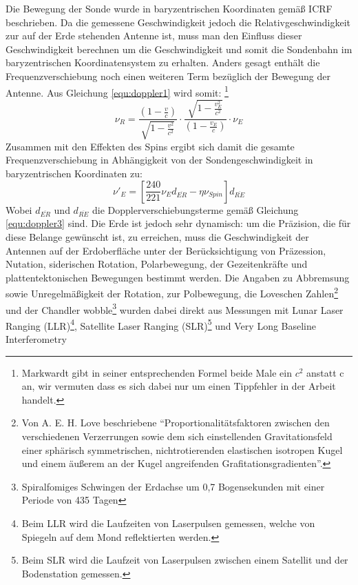 Die Bewegung der Sonde wurde in baryzentrischen Koordinaten gemäß ICRF beschrieben. %
Da die gemessene Geschwindigkeit jedoch die Relativgeschwindigkeit zur auf der Erde stehenden Antenne ist,
muss man den Einfluss dieser Geschwindigkeit berechnen um die Geschwindigkeit und somit die Sondenbahn im baryzentrischen Koordinatensystem zu erhalten.
Anders gesagt enthält die Frequenzverschiebung noch einen weiteren Term bezüglich der Bewegung der Antenne. Aus Gleichung \ref{equ:doppler1} wird somit:
\footnote{Markwardt gibt in seiner entsprechenden Formel beide Male ein $c^2$ anstatt c an, wir vermuten dass es sich dabei nur um einen Tippfehler in der Arbeit handelt.}
\begin{equation}
\label{equ:doppler3}
 \nu_R = \frac{(1-\frac{v}{c})}{\sqrt{1-\frac{v^2}{c^2}}} \cdot \frac{\sqrt{1-\frac{v_E^2}{c^2}}}{(1-\frac{v_E}{c})} \cdot \nu_E 
\end{equation}
Zusammen mit den Effekten des Spins ergibt sich damit die gesamte Frequenzverschiebung in Abhängigkeit von der Sondengeschwindigkeit in baryzentrischen Koordinaten zu:
\begin{equation}
 \nu'_E = \left[ \frac{240}{221} \nu_E d_{\overline{ER}} - \eta \nu_{Spin} \right]  d_{\overline{RE}}
\end{equation}
Wobei $d_{\overline{ER}}$ und $d_{\overline{RE}}$ die Dopplerverschiebungsterme gemäß Gleichung \ref{equ:doppler3} sind.
Die Erde ist jedoch sehr dynamisch: um die Präzision, die für diese Belange gewünscht ist, zu erreichen, muss die Geschwindigkeit der Antennen auf der Erdoberfläche unter der Berücksichtigung von Präzession, Nutation,
siderischen Rotation, Polarbewegung, der Gezeitenkräfte und plattentektonischen Bewegungen bestimmt werden.
Die Angaben zu Abbremsung sowie Unregelmäßigkeit der Rotation, zur Polbewegung, die Loveschen Zahlen\footnote{Von A. E. H. Love beschriebene ``Proportionalitätsfaktoren zwischen den verschiedenen Verzerrungen sowie dem sich einstellenden Gravitationsfeld einer sphärisch symmetrischen, nichtrotierenden elastischen isotropen Kugel und einem äußerem an der Kugel angreifenden Grafitationsgradienten''\cite{Dittus2006}.} und der Chandler wobble\footnote{Spiralfomiges Schwingen
der Erdachse um 0,7 Bogensekunden mit einer Periode von 435 Tagen} %
wurden dabei direkt aus Messungen mit Lunar Laser Ranging (LLR)\footnote{Beim LLR wird die Laufzeiten von Laserpulsen gemessen, welche von Spiegeln auf dem Mond reflektierten werden.},
Satellite Laser Ranging (SLR)\footnote{Beim SLR wird die Laufzeit von Laserpulsen zwischen einem Satellit und der Bodenstation gemessen.} und Very Long Baseline Interferometry
